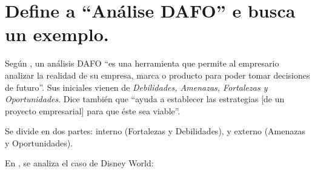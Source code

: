 \documentclass[a4paper]{article}
\begin{document}
\section{Define a ``Análise DAFO'' e busca un exemplo.}

Según \cite{RefWorks:doc:602fb92d8f085533dc6835e1}, un análisis DAFO ``es una herramienta que permite al empresario analizar la realidad de su empresa, marca o producto para poder tomar decisiones de futuro''. Sus iniciales vienen de \textit{Debilidades, Amenazas, Fortalezas y Oportunidades}. Dice también que ``ayuda a establecer las estrategias [de un proyecto empresarial] para que éste sea viable''.

Se divide en dos partes: interno (Fortalezas y Debilidades), y externo (Amenazas y Oportunidades).

En \cite{RefWorks:doc:602fca5f8f085e432d8613ac}, se analiza el caso de Disney World:
\end{document}
